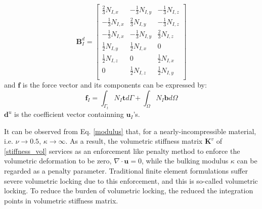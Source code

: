 \begin{equation}
\boldsymbol B^d_I = 
\begin{bmatrix}
     \frac{2}{3}N_{I,x} & -\frac{1}{3}N_{I,y} & -\frac{1}{3}N_{I,z} \\
    -\frac{1}{3}N_{I,x} &  \frac{2}{3}N_{I,y} & -\frac{1}{3}N_{I,z} \\
    -\frac{1}{3}N_{I,x} & -\frac{1}{3}N_{I,y} &  \frac{2}{3}N_{I,z} \\
     \frac{1}{2}N_{I,y} &  \frac{1}{2}N_{I,x} & 0 \\
     \frac{1}{2}N_{I,z} & 0                   &  \frac{1}{2}N_{I,x} \\
    0                   &  \frac{1}{2}N_{I,z} &  \frac{1}{2}N_{I,y} \\
\end{bmatrix}
\end{equation}
and $\boldsymbol f$ is the force vector and its components can be expressed by:
\begin{equation}
\boldsymbol f_I = \int_{\Gamma_t} N_I \boldsymbol t d\Gamma + \int_{\Omega} N_I \boldsymbol b d\Omega
\end{equation}
$\boldsymbol d^u$ is the coefficient vector containning $\boldsymbol u_I$'s.

It can be observed from Eq. \eqref{modulus} that, for a nearly-incompressible material, i.e. $\nu \rightarrow 0.5$, $\kappa \rightarrow \infty$. As a result, the volumetric stiffness matrix $\boldsymbol K^v$ of \eqref{stiffness_vol} services as an enforcement like penalty method to enforce the volumetric deformation to be zero, $\nabla \cdot \boldsymbol u = 0$, while the bulking modulus $\kappa$ can be regarded as a penalty parameter.
Traditional finite element formulations suffer severe volumetric locking due to this enforcement, and this is so-called volumetric locking. 
To reduce the burden of volumetric locking, the reduced the integration points in volumetric stiffness matrix. 


